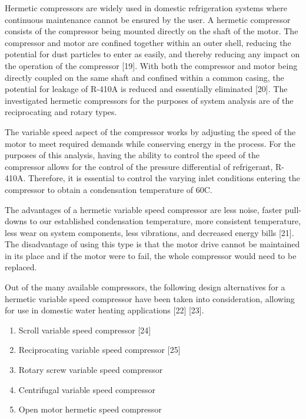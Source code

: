 \medskip
Hermetic compressors are widely used in domestic refrigeration systems where continuous maintenance cannot be ensured by the user. A hermetic compressor consists of the compressor being mounted directly on the shaft of the motor. The compressor and motor are confined together within an outer shell, reducing the potential for dust particles to enter as easily, and thereby reducing any impact on the operation of the compressor [19]. With both the compressor and motor being directly coupled on the same shaft and confined within a common casing, the potential for leakage of R-410A is reduced and essentially eliminated [20]. The investigated hermetic compressors for the purposes of system analysis are of the reciprocating and rotary types.

\medskip
The variable speed aspect of the compressor works by adjusting the speed of the motor to meet required demands while conserving energy in the process. For the purposes of this analysis, having the ability to control the speed of the compressor allows for the control of the pressure differential of refrigerant, R-410A. Therefore, it is essential to control the varying inlet conditions entering the compressor to obtain a condensation temperature of 60\textdegree C.

\medskip
The advantages of a hermetic variable speed compressor are less noise, faster pull-downs to our established condensation temperature, more consistent temperature, less wear on system components, less vibrations, and decreased energy bills [21]. The disadvantage of using this type is that the motor drive cannot be maintained in its place and if the motor were to fail, the whole compressor would need to be replaced.

\medskip
Out of the many available compressors, the following design alternatives for a hermetic variable speed compressor have been taken into consideration, allowing for use in domestic water heating applications [22] [23].

\medskip
\begin{enumerate}[itemsep=3mm, parsep=-1mm]
    \item Scroll variable speed compressor [24]
    \item Reciprocating variable speed compressor [25]
    \item Rotary screw variable speed compressor
    \item Centrifugal variable speed compressor
    \item Open motor hermetic speed compressor
\end{enumerate}

